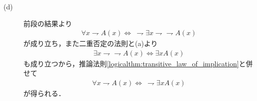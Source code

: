 \begin{prf}
\begin{description}
			\item[(d)]
				前段の結果より
				\begin{align}
					\forall x \rightharpoondown A(x) \Longleftrightarrow\ 
					\rightharpoondown \exists x \rightharpoondown \rightharpoondown A(x)
				\end{align}
				が成り立ち，また二重否定の法則と(a)より
				\begin{align}
					\exists x \rightharpoondown \rightharpoondown A(x)
					\Longleftrightarrow \exists x A(x)
				\end{align}
				も成り立つから，推論法則\ref{logicalthm:transitive_law_of_implication}と併せて
				\begin{align}
					\forall x \rightharpoondown A(x) \Longleftrightarrow\ 
					\rightharpoondown \exists x A(x)
				\end{align}
				が得られる．
				\QED
		\end{description}
	\end{prf}
